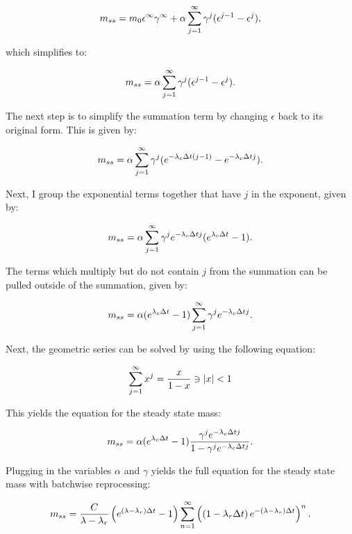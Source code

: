 \begin{equation} \hfill
m_{ss} = m_0 \epsilon^{\infty} \gamma^{\infty} + \alpha \sum_{j=1}^{\infty} \gamma^j (\epsilon^{j-1} - \epsilon^j),
\hfill \end{equation}

which simplifies to:
 
\begin{equation} \hfill
m_{ss} = \alpha \sum_{j=1}^{\infty} \gamma^j (\epsilon^{j-1} - \epsilon^j).
\hfill \end{equation}

The next step is to simplify the summation term by changing $\epsilon$ back to its original form.
This is given by:

\begin{equation} \hfill
m_{ss} = \alpha \sum_{j=1}^{\infty} \gamma^j (e^{-\lambda_c \Delta t (j-1)} - e^{-\lambda_c \Delta t j}).
\hfill \end{equation}

Next, I group the exponential terms together that have $j$ in the exponent, given by:

\begin{equation} \hfill
m_{ss} = \alpha \sum_{j=1}^{\infty} \gamma^j e^{-\lambda_c \Delta t j} (e^{\lambda_c \Delta t} - 1).
\hfill \end{equation}

The terms which multiply but do not contain $j$ from the summation can be pulled outside of the summation, given by:

\begin{equation} \hfill
m_{ss} = \alpha (e^{\lambda_c \Delta t} - 1) \sum_{j=1}^{\infty} \gamma^j e^{-\lambda_c \Delta t j}.
\hfill \end{equation}

Next, the geometric series can be solved by using the following equation:

\begin{equation} \hfill
\sum_{j=1}^{\infty} x^j = \frac{x}{1-x} \ni |x| < 1
\hfill \end{equation}

This yields the equation for the steady state mass:

\begin{equation} \hfill
m_{ss} = \alpha (e^{\lambda_c \Delta t} - 1) \frac{\gamma^j e^{-\lambda_c \Delta t j}}{1 - \gamma^j e^{-\lambda_c \Delta t j}}.
\hfill \end{equation}

Plugging in the variables $\alpha$ and $\gamma$ yields the full equation for the steady state mass with batchwise reprocessing:

\begin{equation} \hfill 
m_{ss} =  \frac{C}{\lambda - \lambda_r} \left(e^{(\lambda - \lambda_r) \Delta t} - 1 \right) \sum_{n=1}^{\infty} \left( \left(1 - \lambda_r \Delta t \right) e^{-(\lambda - \lambda_r) \Delta t} \right)^n.
\hfill \end{equation}
